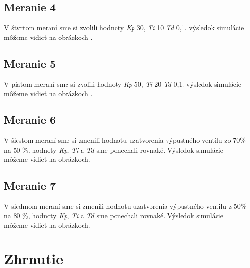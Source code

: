 \documentclass{article}
\begin{document}
\clearpage



\subsection{Meranie 4}
\label{sec:meranie4}

V štvrtom meraní sme si zvolili hodnoty \textit{Kp} 30, \textit{Ti} 10 \textit{Td} 0,1. výsledok simulácie môžeme vidieť na obrázkoch  .


\clearpage

\subsection{Meranie 5}
\label{sec:meranie5}

V piatom meraní sme si zvolili hodnoty \textit{Kp} 50, \textit{Ti} 20 \textit{Td} 0,1. výsledok simulácie môžeme vidieť na obrázkoch  .


\clearpage

\subsection{Meranie 6}
\label{sec:meranie6}

V šiestom meraní sme si zmenili hodnotu uzatvorenia výpustného ventilu zo 70\% na 50 \%, hodnoty
\textit{Kp}, \textit{Ti} a \textit{Td} sme ponechali rovnaké. Výsledok simulácie môžeme vidieť na obrázkoch.


\clearpage

\subsection{Meranie 7}
\label{sec:meranie7}

V siedmom meraní sme si zmenili hodnotu uzatvorenia výpustného ventilu z 50\% na 80 \%, hodnoty
\textit{Kp}, \textit{Ti} a \textit{Td} sme ponechali rovnaké. Výsledok simulácie môžeme vidieť na obrázkoch.


\clearpage

\section{Zhrnutie}
\label{sec:zhrnutie}

\end{document}
